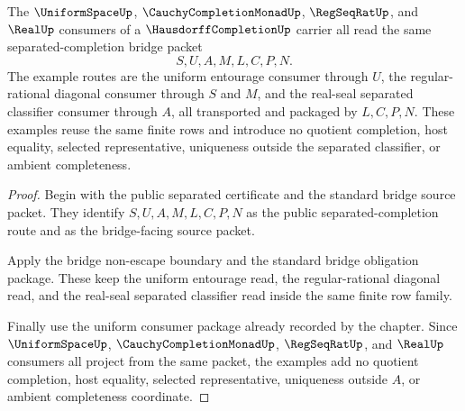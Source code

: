 \begin{theorem}
\label{thm:hausdorff-completion-mature-consumer-examples}
The $\UniformSpaceUp$, $\CauchyCompletionMonadUp$, $\RegSeqRatUp$, and $\RealUp$ consumers of a $\HausdorffCompletionUp$ carrier all read the same separated-completion bridge packet
$$
S,U,A,M,L,C,P,N.
$$
The example routes are the uniform entourage consumer through $U$, the regular-rational diagonal consumer through $S$ and $M$, and the real-seal separated classifier consumer through $A$, all transported and packaged by $L,C,P,N$. These examples reuse the same finite rows and introduce no quotient completion, host equality, selected representative, uniqueness outside the separated classifier, or ambient completeness.
\end{theorem}
\begin{proof}
Begin with the public separated certificate and the standard bridge source packet. They identify $S,U,A,M,L,C,P,N$ as the public separated-completion route and as the bridge-facing source packet.

Apply the bridge non-escape boundary and the standard bridge obligation package. These keep the uniform entourage read, the regular-rational diagonal read, and the real-seal separated classifier read inside the same finite row family.

Finally use the uniform consumer package already recorded by the chapter. Since $\UniformSpaceUp$, $\CauchyCompletionMonadUp$, $\RegSeqRatUp$, and $\RealUp$ consumers all project from the same packet, the examples add no quotient completion, host equality, selected representative, uniqueness outside $A$, or ambient completeness coordinate.
\end{proof}

